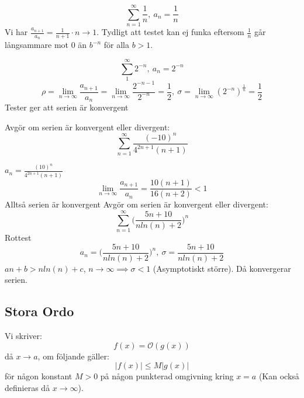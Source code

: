 \documentclass{report}
\begin{document}
\ex{}
{
\begin{equation*}
\sum_{n = 1}^{ \infty} \frac{1}{n}, \: a_n = \frac{1}{n} 
\end{equation*}
Vi har $ \frac{a_{n+1}}{a_n}  = \frac{1}{n+1} \cdot n \to 1 $. Tydligt att testet kan ej funka eftersom $ \frac{1}{n}  $ går långsammare mot 0 än $ b^{-n} $ för alla $ b > 1 $. 
}

\ex{}
{
\begin{equation*}
	\sum_{1}^{ \infty} 2^{-n} , \: a_n = 2^{-n}
\end{equation*}
\begin{equation*}
	\rho = \lim_{n \to \infty} \frac{a_{n+1}}{a_n}  = \lim_{n \to \infty} \frac{2^{-n-1}}{2^{-n}} = \frac{1}{2}, \: \sigma = \lim_{ n \to \infty} (2^{-n})^{ \frac{1}{n}  } = \frac{1}{2} 
\end{equation*}
Tester ger att serien är konvergent
}

\qs{}
{
Avgör om serien är konvergent eller divergent:
\begin{equation*}
	\sum_{n = 1}^{ \infty} \frac{(-10)^n}{4^{2n+1}(n+1)} 
\end{equation*}
}

\sol 
$ a_n = \frac{(10)^n}{4^{2n+1}(n+1)}  $ 
\begin{equation*}
	\lim_{n \to \infty} \frac{a_{n+1}}{a_n} = \frac{10(n+1)}{16(n+2)} < 1   
\end{equation*}
Alltså serien är konvergent
\vspace{20pt}
\qs{}
{
Avgör om serien är konvergent eller divergent:
\begin{equation*}
\sum_{n = 1}^{ \infty} \bigl( \frac{5n+10}{nln(n)+2}   \bigr)^n
\end{equation*}
}
\sol Rottest
\begin{equation*}
a_n = \bigl( \frac{5n+10}{nln(n)+2} \bigr)^n, \: \sigma = \frac{5n+10}{nln(n)+2}  
\end{equation*}
$ an+b > nln(n)+c $, $ n \to \infty \implies \sigma < 1$ (Asymptotiskt större). Då konvergerar serien.  

\subsection{Stora Ordo}

{
Vi skriver:
\begin{equation*}
	f(x) = \mathcal{O}(g(x))
\end{equation*}
då $ x \to a $, om följande gäller:
\begin{equation*}
|f(x)| \le M |g(x)|
\end{equation*}
för någon konstant $ M > 0 $ på någon punkterad omgivning kring $ x = a $ (Kan också definieras då $ x \to \infty $).
}
\end{document}
